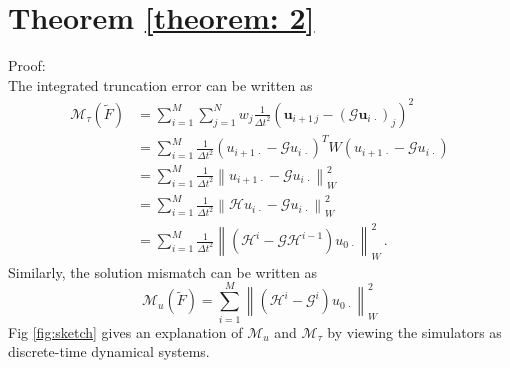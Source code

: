\section{Theorem \ref{theorem: 2}}
\label{proof 2}
Proof: \\
The integrated truncation error can be written as
\begin{equation*}\begin{split}
    \mathcal{M}_{\tau}(\tilde{F}) &= 
        \sum_{i=1}^M \sum_{j=1}^N w_{j} \frac{1}{\Delta t^2}\left(
        \boldsymbol{u}_{i+1\, j} - (\mathcal{G}\boldsymbol{u}_{i\, \cdot})_j
        \right)^2\\
    &= \sum_{i=1}^M \frac{1}{\Delta t^2}(u_{i+1\,\cdot} - \mathcal{G} u_{i\,\cdot})^T W
                    (u_{i+1\,\cdot} - \mathcal{G} u_{i\,\cdot}) \\
    &= \sum_{i=1}^M \frac{1}{\Delta t^2}\left\|u_{i+1\,\cdot} - \mathcal{G} u_{i\,\cdot}\right\|^2_{W}\\
    &= \sum_{i=1}^M \frac{1}{\Delta t^2}\left\| \mathcal{H} u_{i\, \cdot} - \mathcal{G} u_{i\,\cdot} \right\|^2_{W}\\
    &= \sum_{i=1}^M \frac{1}{\Delta t^2} \left\| \left(\mathcal{H}^i - \mathcal{G} \mathcal{H}^{i-1}\right)
       u_{0\,\cdot} \right\|^2_{W}\,.
\end{split}\end{equation*}
Similarly, the solution mismatch can be written as
\begin{equation*}
    \mathcal{M}_u(\tilde{F}) = \sum_{i=1}^M \left\| 
    \left(\mathcal{H}^i - \mathcal{G}^i\right)
    u_{0\,\cdot} \right\|^2_{W}
\end{equation*}
Fig \ref{fig:sketch} gives an explanation of $\mathcal{M}_u$ and $\mathcal{M}_{\tau}$ by viewing 
the simulators as discrete-time dynamical systems.\\

